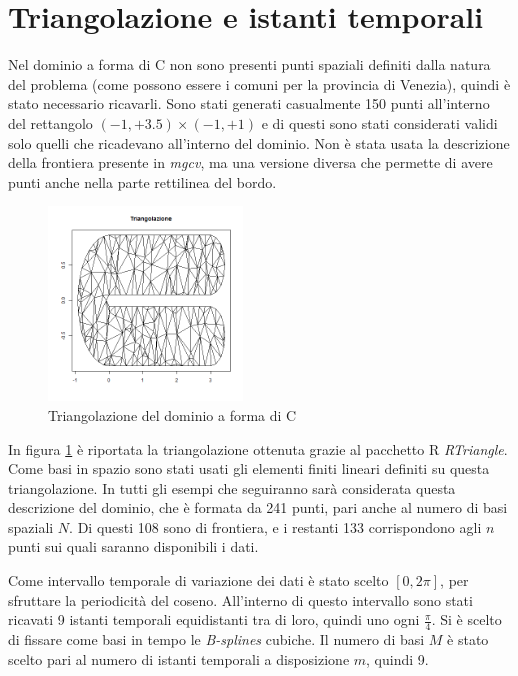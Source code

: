 \documentclass[a4paper,11pt,twoside,openright]{book}							%
\begin{document}
\section{Triangolazione e istanti temporali}
Nel dominio a forma di C non sono presenti punti spaziali definiti dalla natura del problema (come possono essere i comuni per la provincia di Venezia), quindi è stato necessario ricavarli. Sono stati generati casualmente 150 punti all'interno del rettangolo $(-1,+3.5) \times (-1,+1)$ e di questi sono stati considerati validi solo quelli che ricadevano all'interno del dominio. Non è stata usata la descrizione della frontiera presente in \textit{mgcv}, ma una versione diversa che permette di avere punti anche nella parte rettilinea del bordo.
\begin{figure}[t]
	\centering
	\includegraphics[width=0.46\textwidth]{Immagini/DomC_Triangolazione.png}
	\caption{Triangolazione del dominio a forma di C}
	\label{fig:domC_triang}
\end{figure}
In figura \ref{fig:domC_triang} è riportata la triangolazione ottenuta grazie al pacchetto R \textit{RTriangle}. Come basi in spazio sono stati usati gli elementi finiti lineari definiti su questa triangolazione. In tutti gli esempi che seguiranno sarà considerata questa descrizione del dominio, che è formata da 241 punti, pari anche al numero di basi spaziali $N$. Di questi 108 sono di frontiera, e i restanti 133 corrispondono agli $n$ punti sui quali saranno disponibili i dati.

Come intervallo temporale di variazione dei dati è stato scelto $[0,2\pi]$, per sfruttare la periodicità del coseno. All'interno di questo intervallo sono stati ricavati 9 istanti temporali equidistanti tra di loro, quindi uno ogni $\frac{\pi}{4}$. Si è scelto di fissare come basi in tempo le \textit{B-splines} cubiche. Il numero di basi $M$ è stato scelto pari al numero di istanti temporali a disposizione $m$, quindi 9. 
\end{document}

